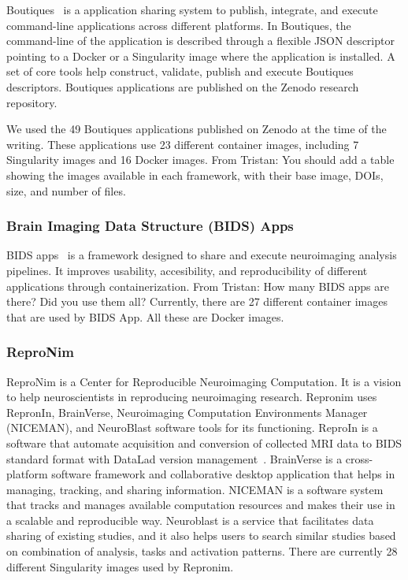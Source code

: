 \documentclass[a4paper,num-refs]{oup-contemporary}
\newcommand{\TG}[1]{\color{blue}From Tristan: #1 \color{black}}
\begin{document}
Boutiques~\cite{glatard2018boutiques} is a application sharing system to
publish, integrate, and execute command-line applications across different
platforms. In Boutiques, the command-line of the application is described
through a flexible JSON descriptor pointing to a Docker or a Singularity
image where the application is installed. A set of core tools help
construct, validate, publish and execute Boutiques descriptors. Boutiques
applications are published on the Zenodo research repository.

We used the 49 Boutiques applications published on Zenodo at the time of
the writing. These applications use 23 different container images,
including 7 Singularity images and 16 Docker images. \TG{You should add a
table showing the images available in each framework, with their base
image, DOIs, size, and number of files.}

\subsubsection{Brain Imaging Data Structure (BIDS) Apps}

BIDS apps~\cite{gorgolewski2017bids} is a framework designed to share and execute neuroimaging
analysis pipelines. It improves usability, accesibility, and reproducibility
of different applications through containerization.
\TG{How many BIDS apps are there? Did you use them all?} Currently, there are 27 different container images that are used by
BIDS App. All these are Docker images.

\subsubsection{ReproNim}

ReproNim is a Center for Reproducible Neuroimaging Computation. It is a vision
to help neuroscientists in reproducing neuroimaging research. Repronim
uses RepronIn, BrainVerse, Neuroimaging Computation Environments Manager (NICEMAN),
and NeuroBlast software tools for its
functioning. ReproIn is a software that automate acquisition and conversion
of collected MRI data to BIDS standard format with DataLad version management~\cite{kennedy2019everything}.
BrainVerse is a cross-platform software framework and collaborative desktop application
that helps in managing, tracking, and sharing information.
NICEMAN is a software system that tracks and manages available computation resources
and makes their use in a scalable and reproducible way.
Neuroblast is a service that facilitates data sharing of existing studies, and it also
helps users to search similar studies based on combination of analysis,
tasks and activation patterns. There are currently 28 different Singularity
images used by Repronim. 
\end{document}
